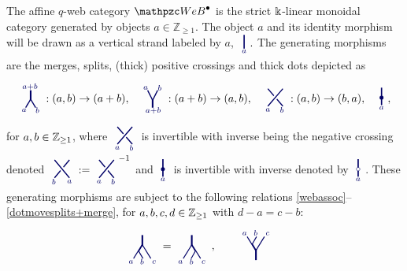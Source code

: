 \begin{definition}
  \label{def:qAWeb}
The affine $q$-web category $\qAW$ is the strict $\Bbbk$-linear monoidal category generated by objects $a\in \mathbb Z_{\ge1}$. The object $a$ and its identity morphism  will be drawn as a vertical strand labeled by $a$,
$\stra.$
The generating morphisms are the merges, splits, (thick) positive crossings and thick dots depicted as
\begin{align}
\label{merge+split+crossing}
\merge 
&:(a,b) \rightarrow (a+b),&
\splits
&:(a+b)\rightarrow (a,b),&
\crossingpos
&:(a,b) \rightarrow (b,a), &
\wkdotaa , 
\end{align}
for $a,b \in \mathbb{Z}_{\ge 1}$, where $\crossingpos$ is invertible with inverse being the negative crossing denoted $\crossingneg := \crossingpos^{-1}$ and $\xdota$ is invertible with inverse denoted by $\zdota$. 
These generating morphisms are subject to the following relations \eqref{webassoc}--\eqref{dotmovesplits+merge}, for $a,b,c,d \in \mathbb{Z}_{\ge 1}$ with $d-a=c-b$:
\begin{align}
\label{webassoc}
\begin{tikzpicture}[baseline = 0,color=\clr]
	\draw[-,thick] (0.35,-.3) to (0.08,0.14);
	\draw[-,thick] (0.1,-.3) to (-0.04,-0.06);
	\draw[-,line width=1pt] (0.085,.14) to (-0.035,-0.06);
	\draw[-,thick] (-0.2,-.3) to (0.07,0.14);
	\draw[-,line width=1.5pt] (0.08,.45) to (0.08,.1);
        \node at (0.45,-.41) {$\scriptstyle c$};
        \node at (0.07,-.4) {$\scriptstyle b$};
        \node at (-0.28,-.41) {$\scriptstyle a$};
\end{tikzpicture}
&=
\begin{tikzpicture}[baseline = 0, color=\clr]
	\draw[-,thick] (0.36,-.3) to (0.09,0.14);
	\draw[-,thick] (0.06,-.3) to (0.2,-.05);
	\draw[-,line width=.8pt] (0.07,.14) to (0.19,-.06);
	\draw[-,thick] (-0.19,-.3) to (0.08,0.14);
	\draw[-,line width=1.5pt] (0.08,.45) to (0.08,.1);
        \node at (0.45,-.41) {$\scriptstyle c$};
        \node at (0.07,-.4) {$\scriptstyle b$};
        \node at (-0.28,-.41) {$\scriptstyle a$};
\end{tikzpicture}\:,
\qquad
\begin{tikzpicture}[baseline = -1mm, color=\clr]
	\draw[-,thick] (0.35,.3) to (0.08,-0.14);
	\draw[-,thick] (0.1,.3) to (-0.04,0.06);
	\draw[-,line width=1pt] (0.085,-.14) to (-0.035,0.06);
	\draw[-,thick] (-0.2,.3) to (0.07,-0.14);
	\draw[-,line width=1.5pt] (0.08,-.45) to (0.08,-.1);
        \node at (0.45,.4) {$\scriptstyle c$};
        \node at (0.07,.42) {$\scriptstyle b$};
        \node at (-0.28,.4) {$\scriptstyle a$};

\end{tikzpicture}
\end{align}
\end{definition}
